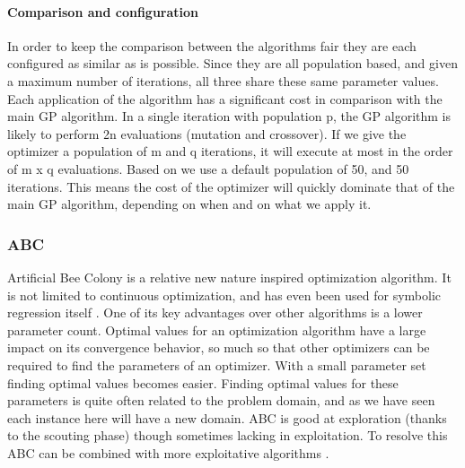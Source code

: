 \paragraph{Comparison and configuration}
In order to keep the comparison between the algorithms fair they are each configured as similar as is possible. Since they are all population based, and given a maximum number of iterations, all three share these same parameter values. Each application of the algorithm has a significant cost in comparison with the main GP algorithm. In a single iteration with population p, the GP algorithm is likely to perform 2n evaluations (mutation and crossover). If we give the optimizer a population of m and q iterations, it will execute at most in the order of  m x q evaluations. Based on \cite{PSO} we use a default population of 50, and 50 iterations. This means the cost of the optimizer will quickly dominate that of the main GP algorithm, depending on when and on what we apply it.

\subsubsection{ABC}
Artificial Bee Colony \citep{ABC} is a relative new nature inspired optimization algorithm. It is not limited to continuous optimization, and has even been used for symbolic regression itself \cite{ABCSR}. One of its key advantages over other algorithms is a lower parameter count. Optimal values for an optimization algorithm have a large impact on its convergence behavior, so much so that other optimizers can be required to find the parameters of an optimizer. With a small parameter set finding optimal values becomes easier. Finding optimal values for these parameters is quite often related to the problem domain, and as we have seen each instance here will have a new domain. ABC is good at exploration (thanks to the scouting phase) though sometimes lacking in exploitation. To resolve this ABC can be combined with more exploitative algorithms \citep{ABCPSO}.


